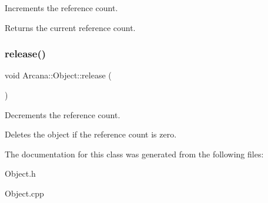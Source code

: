 Increments the reference count. 

Returns the current reference count. \mbox{\label{class_arcana_1_1_object_aa14c503a92c2a630c119c5a21ea040f8}} 
\subsubsection{\texorpdfstring{release()}{release()}}
{\footnotesize\ttfamily void Arcana\+::\+Object\+::release (\begin{DoxyParamCaption}{ }\end{DoxyParamCaption})\hspace{0.3cm}{\ttfamily [virtual]}}



Decrements the reference count. 

Deletes the object if the reference count is zero. 

The documentation for this class was generated from the following files\+:\begin{DoxyCompactItemize}
\item 
Object.\+h\item 
Object.\+cpp\end{DoxyCompactItemize}
